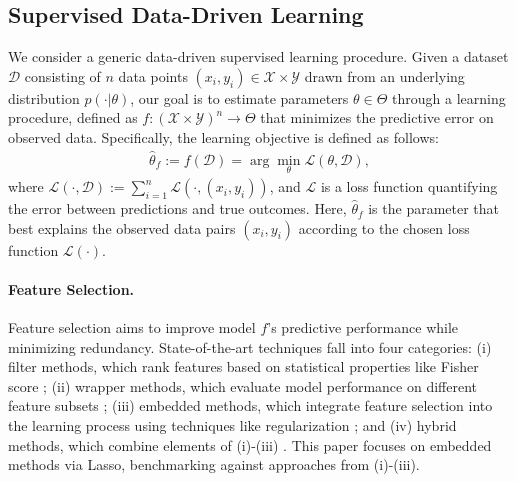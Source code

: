 \subsection{Supervised Data-Driven Learning}\label{subsec:supervised}
We consider a generic data-driven supervised learning procedure. Given a dataset \( \mathcal{D} \) consisting of \( n \) data points \( (x_i, y_i) \in \mathcal{X} \times \mathcal{Y} \) drawn from an underlying distribution \( p(\cdot|\theta) \), our goal is to estimate parameters \( \theta \in \Theta \) through a learning procedure, defined as \( f: (\mathcal{X} \times \mathcal{Y})^n \rightarrow \Theta \) 
that minimizes the predictive error on observed data. 
Specifically, the learning objective is defined as follows:
\begin{align}
\hat{\theta}_f := f(\mathcal{D}) = \arg\min_{\theta} \mathcal{L}(\theta, \mathcal{D}),
\end{align}
where \( \mathcal{L}(\cdot,\mathcal{D}) := \sum_{i=1}^{n} \mathcal{L}(\cdot, (x_i, y_i))\), and $\mathcal{L}$ is a loss function quantifying the error between predictions and true outcomes. 
Here, $\hat{\theta}_f$ is the parameter that best explains the observed data pairs \( (x_i, y_i) \) according to the chosen loss function \( \mathcal{L} (\cdot) \).

\paragraph{Feature Selection.}
Feature selection aims to improve model \( f \)'s predictive performance while minimizing redundancy. 
 State-of-the-art techniques fall into four categories: (i) filter methods, which rank features based on statistical properties like Fisher score \citep{duda2001pattern,song2012feature}; (ii) wrapper methods, which evaluate model performance on different feature subsets \citep{kohavi1997wrappers}; (iii) embedded methods, which integrate feature selection into the learning process using techniques like regularization \citep{tibshirani1996LASSO,lemhadri2021lassonet}; and (iv) hybrid methods, which combine elements of (i)-(iii) \citep{SINGH2021104396,li2022micq}. This paper focuses on embedded methods via Lasso, benchmarking against approaches from (i)-(iii).

